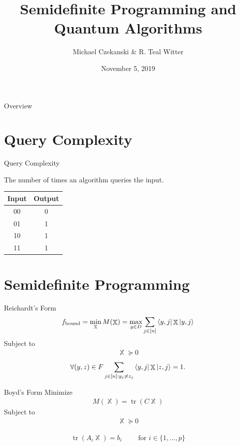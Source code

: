 \documentclass[12pt]{beamer}
\title{Semidefinite Programming and Quantum Algorithms}
\author{Michael Czekanski \& R. Teal Witter}
\institute{Middlebury College}
\date{November 5, 2019}
\DeclareMathOperator{\X}{\mathbb{X}}		     %
\DeclareMathOperator{\tr}{\text{tr}}		     %
\begin{document}
\graphicspath{{./../figures/}}

\frame{\titlepage}

\begin{frame}{Overview}
\tableofcontents
\end{frame}

\section{Query Complexity}
\begin{frame}{Query Complexity}
\begin{center}
The number of times an algorithm queries the input.
\end{center}
\begin{table}[]
\begin{tabular}{cc}
\hline
\textbf{Input} & \textbf{Output} \\ \hline
00             & 0               \\
01             & 1               \\
10             & 1               \\
11             & 1               \\ \hline
\end{tabular}
\end{table}
\end{frame}

\section{Semidefinite Programming}

\begin{frame}{Reichardt's Form \cite{reichardt2009span}}
\begin{align} \label{eq:reichardtObj} 
    f_{\text{bound}} = \min_{\X} M(\X) = \max_{y \in D} \sum_{j \in [n]}
    \bra{y,j}\X\ket{y,j} 
\end{align}
Subject to
\begin{align}\label{Eq:reichardtSemi}
    \X \succcurlyeq 0 
\end{align}
\begin{align}\label{Eq:reichardtOffDiag}
    \forall (y,z) \in F \sum_{j \in [n]: y_j \ne z_j} 
    \bra{y,j} \X \ket{z, j} = 1.
\end{align}
\end{frame}

\begin{frame}{Boyd's Form \cite{boyd2004convex}}
Minimize
\begin{align}\label{Eq:boyd_obj}
    M(\X) = \tr(C\X) 
\end{align}
Subject to
\begin{align} \label{Eq:boydSemi}
    \X \succcurlyeq 0   
\end{align}

\begin{align} \label{Eq:boydTraceCon}
    \tr(A_i \X) = b_i  \text{$\qquad$ for $i \in \{1,...,p\}$}
\end{align}
\end{frame}
\end{document}
